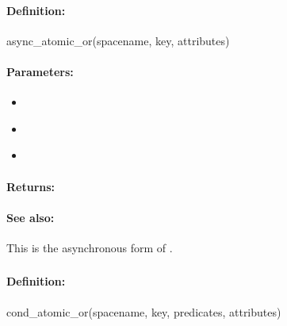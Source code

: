 \paragraph{Definition:}
\begin{rubycode}
async_atomic_or(spacename, key, attributes)
\end{rubycode}

\paragraph{Parameters:}
\begin{itemize}[noitemsep]
\item {}\\

\item {}\\

\item {}\\

\end{itemize}

\paragraph{Returns:}


\paragraph{See also:}  This is the asynchronous form of .

\pagebreak
\subsubsection{}
\label{api:ruby:cond_atomic_or}


\paragraph{Definition:}
\begin{rubycode}
cond_atomic_or(spacename, key, predicates, attributes)
\end{rubycode}

